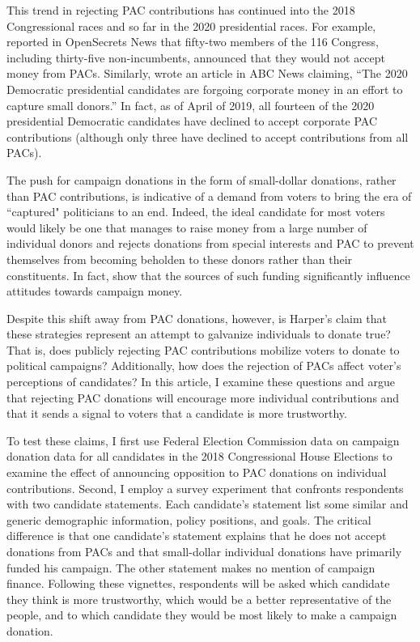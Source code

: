 \documentclass[12pt]{article}
\begin{document}
This trend in rejecting PAC contributions has continued into the 2018 Congressional races and so far in the 2020 presidential races. For example, \citet{evers-hillstrom_democrats_2018} reported in OpenSecrets News that fifty-two members of the 116 Congress, including thirty-five non-incumbents, announced that they would not accept money from PACs. Similarly,  wrote an article in ABC News claiming, ``The 2020 Democratic presidential candidates are forgoing corporate money in an effort to capture small donors.'' In fact, as of April of 2019, all fourteen of the 2020 presidential Democratic candidates have declined to accept corporate PAC contributions (although only three have declined to accept contributions from all PACs). 

The push for campaign donations in the form of small-dollar donations, rather than PAC contributions, is indicative of a demand from voters to bring the era of ``captured" politicians to an end. Indeed, the ideal candidate for most voters would likely be one that manages to raise money from a large number of individual donors and rejects donations from special interests and PAC to prevent themselves from becoming beholden to these donors rather than their constituents. In fact, \citet{bowler_campaign_2016} show that the sources of such funding significantly influence attitudes towards campaign money.  

Despite this shift away from PAC donations, however, is Harper's \citeyear{harper_2020_2019} claim that these strategies represent an attempt to galvanize individuals to donate true? That is, does publicly rejecting PAC contributions mobilize voters to donate to political campaigns? Additionally, how does the rejection of PACs affect voter's perceptions of candidates?  In this article, I examine these questions and argue that rejecting PAC donations will encourage more individual contributions and that it sends a signal to voters that a candidate is more trustworthy.

To test these claims, I first use Federal Election Commission data on campaign donation data for all candidates in the 2018 Congressional House Elections to examine the effect of announcing opposition to PAC donations on individual contributions. Second, I employ a survey experiment that confronts respondents with two candidate statements. Each candidate's statement list some similar and generic demographic information, policy positions, and goals. The critical difference is that one candidate's statement explains that he does not accept donations from PACs and that small-dollar individual donations have primarily funded his campaign. The other statement makes no mention of campaign finance. Following these vignettes, respondents will be asked which candidate they think is more trustworthy, which would be a better representative of the people, and to which candidate they would be most likely to make a campaign donation. 
\end{document}
